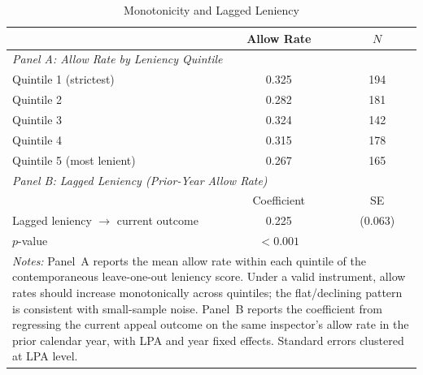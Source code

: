 \begin{table}[t]
\centering
\caption{Monotonicity and Lagged Leniency}
\label{tab:reduced_form}
\begin{tabular}{lcc}
\hline\hline
 & Allow Rate & $N$ \\
\hline
\multicolumn{3}{l}{\textit{Panel A: Allow Rate by Leniency Quintile}} \\[3pt]
Quintile 1 (strictest) & 0.325 & 194 \\
Quintile 2 & 0.282 & 181 \\
Quintile 3 & 0.324 & 142 \\
Quintile 4 & 0.315 & 178 \\
Quintile 5 (most lenient) & 0.267 & 165 \\[6pt]
\multicolumn{3}{l}{\textit{Panel B: Lagged Leniency (Prior-Year Allow Rate)}} \\[3pt]
 & Coefficient & SE \\
\hline
Lagged leniency $\rightarrow$ current outcome & 0.225 & (0.063) \\
$p$-value & $< 0.001$ & \\
\hline
\multicolumn{3}{p{0.85\textwidth}}{\footnotesize \textit{Notes:} Panel~A reports the mean allow rate within each quintile of the contemporaneous leave-one-out leniency score. Under a valid instrument, allow rates should increase monotonically across quintiles; the flat/declining pattern is consistent with small-sample noise. Panel~B reports the coefficient from regressing the current appeal outcome on the same inspector's allow rate in the prior calendar year, with LPA and year fixed effects. Standard errors clustered at LPA level.} \\
\end{tabular}
\end{table}
